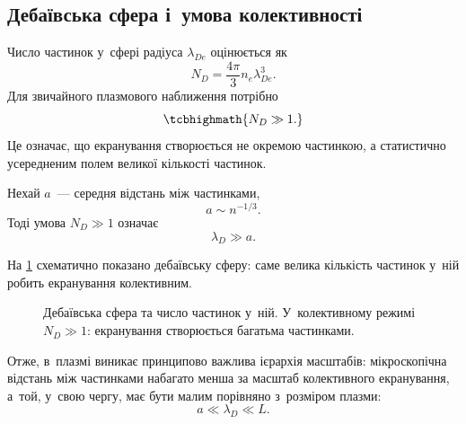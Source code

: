 \subsection{Дебаївська сфера і~умова колективності}



Число частинок у~сфері радіуса $\lambda_{De}$ оцінюється як
\begin{equation}
	N_D=\frac{4\pi}{3}n_e\lambda_{De}^3.
\end{equation}
Для звичайного плазмового наближення потрібно
\begin{equation}
	\tcbhighmath{N_D\gg1.}
\end{equation}
Це означає, що екранування створюється не окремою частинкою, а статистично усередненим полем великої кількості частинок.

Нехай $a$~--- середня відстань між частинками,
\begin{equation}
	a\sim n^{-1/3}.
\end{equation}
Тоді умова $N_D\gg1$ означає
\begin{equation*}
	\lambda_D\gg a.
\end{equation*}

На \ref{fig:debye-sphere} схематично показано дебаївську сферу: саме велика кількість частинок у~ній робить екранування колективним.

\begin{figure}\centering
	\caption{Дебаївська сфера та число частинок у~ній. У~колективному режимі $N_D\gg1$: екранування створюється багатьма частинками.}\label{fig:debye-sphere}
\end{figure}
Отже, в~плазмі виникає принципово важлива ієрархія масштабів: мікроскопічна відстань між частинками набагато менша за масштаб колективного екранування, а~той, у~свою чергу, має бути малим порівняно з~розміром плазми:
\begin{equation}
	a\ll\lambda_D\ll L.
\end{equation}

